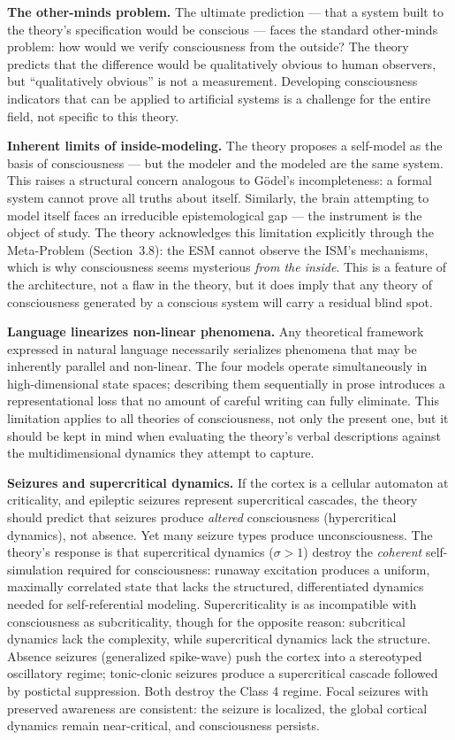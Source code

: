 \documentclass[12pt]{article}
\newcommand{\revstart}{}
\newcommand{\revend}{}
\begin{document}
\textbf{The other-minds problem.} The ultimate prediction --- that a system built to the theory's specification would be conscious --- faces the standard other-minds problem: how would we verify consciousness from the outside? The theory predicts that the difference would be qualitatively obvious to human observers, but ``qualitatively obvious'' is not a measurement. Developing consciousness indicators that can be applied to artificial systems is a challenge for the entire field, not specific to this theory.

\textbf{Inherent limits of inside-modeling.} The theory proposes a self-model as the basis of consciousness --- but the modeler and the modeled are the same system. This raises a structural concern analogous to G{\"o}del's incompleteness: a formal system cannot prove all truths about itself. Similarly, the brain attempting to model itself faces an irreducible epistemological gap --- the instrument is the object of study. The theory acknowledges this limitation explicitly through the Meta-Problem (Section~3.8): the ESM cannot observe the ISM's mechanisms, which is why consciousness seems mysterious \emph{from the inside}. This is a feature of the architecture, not a flaw in the theory, but it does imply that any theory of consciousness generated by a conscious system will carry a residual blind spot.

\textbf{Language linearizes non-linear phenomena.} Any theoretical framework expressed in natural language necessarily serializes phenomena that may be inherently parallel and non-linear. The four models operate simultaneously in high-dimensional state spaces; describing them sequentially in prose introduces a representational loss that no amount of careful writing can fully eliminate. This limitation applies to all theories of consciousness, not only the present one, but it should be kept in mind when evaluating the theory's verbal descriptions against the multidimensional dynamics they attempt to capture.

{\revstart\textbf{Seizures and supercritical dynamics.} If the cortex is a cellular automaton at criticality, and epileptic seizures represent supercritical cascades, the theory should predict that seizures produce \emph{altered} consciousness (hypercritical dynamics), not absence. Yet many seizure types produce unconsciousness. The theory's response is that supercritical dynamics ($\sigma > 1$) destroy the \emph{coherent} self-simulation required for consciousness: runaway excitation produces a uniform, maximally correlated state that lacks the structured, differentiated dynamics needed for self-referential modeling. Supercriticality is as incompatible with consciousness as subcriticality, though for the opposite reason: subcritical dynamics lack the complexity, while supercritical dynamics lack the structure. Absence seizures (generalized spike-wave) push the cortex into a stereotyped oscillatory regime; tonic-clonic seizures produce a supercritical cascade followed by postictal suppression. Both destroy the Class 4 regime. Focal seizures with preserved awareness are consistent: the seizure is localized, the global cortical dynamics remain near-critical, and consciousness persists.\revend}
\end{document}
